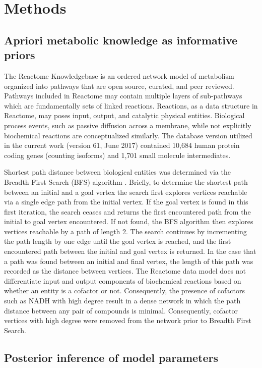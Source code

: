 \documentclass[11pt]{article}
\begin{document}
\section{Methods}
\subsection{Apriori metabolic knowledge as informative priors}
The Reactome Knowledgebase \citep{croft2014,fabregat2016} is an ordered network model of metabolism organized into pathways that are open source, curated, and peer reviewed. Pathways included in Reactome may contain multiple layers of sub-pathways which are fundamentally sets of linked reactions. Reactions, as a data structure in Reactome, may poses input, output, and catalytic physical entities. Biological process events, such as passive diffusion across a membrane, while not explicitly biochemical reactions are conceptualized similarly. The database version utilized in the current work (version 61, June 2017) contained 10,684 human protein coding genes (counting isoforms) and 1,701 small molecule intermediates. 

Shortest path distance between biological entities was determined via the Breadth First Search (BFS) algorithm \cite{russell2010}. Briefly, to determine the shortest path between an initial and a goal vertex the search first explores vertices reachable via a single edge path from the initial vertex. If the goal vertex is found in this first iteration, the search ceases and returns the first encountered path from the initial to goal vertex encountered. If not found, the BFS algorithm then explores vertices reachable by a path of length 2. The search continues by incrementing the path length by one edge until the goal vertex is reached, and the first encountered path between the initial and goal vertex is returned. In the case that a path was found between an initial and final vertex, the length of this path was recorded as the distance between vertices. The Reactome data model does not differentiate input and output components of biochemical reactions based on whether an entity is a cofactor or not. Consequently, the presence of cofactors such as NADH with high degree result in a dense network in which the path distance between any pair of compounds is minimal. Consequently, cofactor vertices with high degree were removed from the network prior to Breadth First Search.
\subsection{Posterior inference of model parameters}
\end{document}
